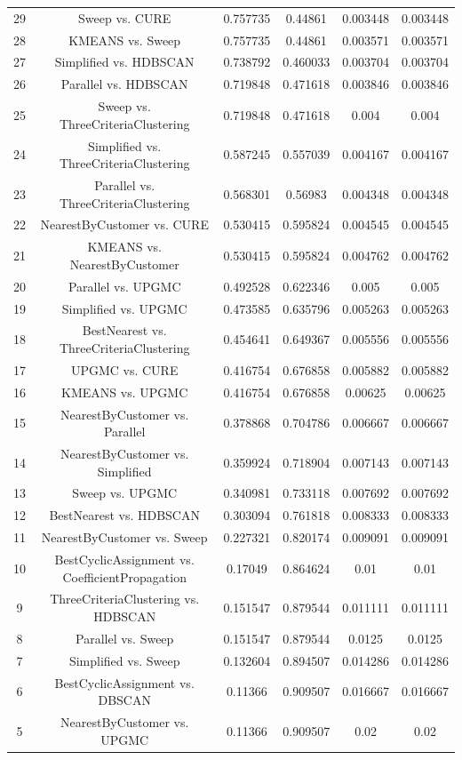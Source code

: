 \documentclass[a4paper,10pt]{article}
\begin{document}
\begin{landscape}
\begin{table}[!htp]
\begin{tabular}{cccccc}
29&Sweep vs. CURE&0.757735&0.44861&0.003448&0.003448\\
28&KMEANS vs. Sweep&0.757735&0.44861&0.003571&0.003571\\
27&Simplified vs. HDBSCAN&0.738792&0.460033&0.003704&0.003704\\
26&Parallel vs. HDBSCAN&0.719848&0.471618&0.003846&0.003846\\
25&Sweep vs. ThreeCriteriaClustering&0.719848&0.471618&0.004&0.004\\
24&Simplified vs. ThreeCriteriaClustering&0.587245&0.557039&0.004167&0.004167\\
23&Parallel vs. ThreeCriteriaClustering&0.568301&0.56983&0.004348&0.004348\\
22&NearestByCustomer vs. CURE&0.530415&0.595824&0.004545&0.004545\\
21&KMEANS vs. NearestByCustomer&0.530415&0.595824&0.004762&0.004762\\
20&Parallel vs. UPGMC&0.492528&0.622346&0.005&0.005\\
19&Simplified vs. UPGMC&0.473585&0.635796&0.005263&0.005263\\
18&BestNearest vs. ThreeCriteriaClustering&0.454641&0.649367&0.005556&0.005556\\
17&UPGMC vs. CURE&0.416754&0.676858&0.005882&0.005882\\
16&KMEANS vs. UPGMC&0.416754&0.676858&0.00625&0.00625\\
15&NearestByCustomer vs. Parallel&0.378868&0.704786&0.006667&0.006667\\
14&NearestByCustomer vs. Simplified&0.359924&0.718904&0.007143&0.007143\\
13&Sweep vs. UPGMC&0.340981&0.733118&0.007692&0.007692\\
12&BestNearest vs. HDBSCAN&0.303094&0.761818&0.008333&0.008333\\
11&NearestByCustomer vs. Sweep&0.227321&0.820174&0.009091&0.009091\\
10&BestCyclicAssignment vs. CoefficientPropagation&0.17049&0.864624&0.01&0.01\\
9&ThreeCriteriaClustering vs. HDBSCAN&0.151547&0.879544&0.011111&0.011111\\
8&Parallel vs. Sweep&0.151547&0.879544&0.0125&0.0125\\
7&Simplified vs. Sweep&0.132604&0.894507&0.014286&0.014286\\
6&BestCyclicAssignment vs. DBSCAN&0.11366&0.909507&0.016667&0.016667\\
5&NearestByCustomer vs. UPGMC&0.11366&0.909507&0.02&0.02\\

\end{tabular}
\end{table}
\end{landscape}
\end{document}
